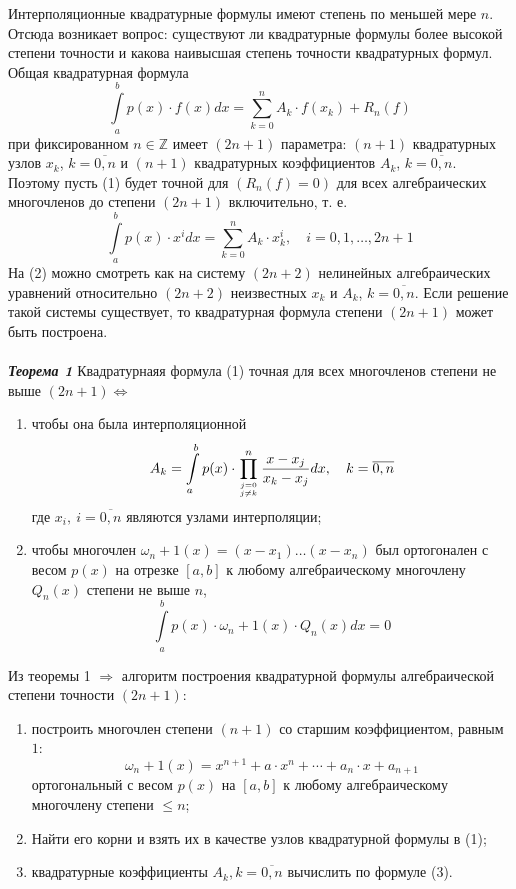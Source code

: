 \documentclass[14pt,a4paper,titlepage]{extarticle}
\begin{document}
Интерполяционные квадратурные формулы имеют степень по меньшей мере $n$. Отсюда возникает вопрос: существуют ли квадратурные формулы более высокой степени точности и какова наивысшая степень точности квадратурных формул. \\
Общая квадратурная формула
\begin{equation}
\int\limits_a^b p(x)\cdot f(x)dx = \sum_{k = 0}^n A_k \cdot f(x_k) + R_n(f)
\label{(1)}
\end{equation}
при фиксированном $n \in \mathbb{Z} $ имеет $(2n + 1)$ параметра: $(n+1)$ квадратурных узлов $x_k$, $k = \overline{0,n}$ и $(n+1)$ квадратурных коэффициентов $A_k$, $k = \overline{0,n}$. Поэтому пусть (1) будет точной для $( R_n ( f ) = 0 )$ для всех алгебраических многочленов до степени $(2n + 1)$ включительно, т. е.
\begin{equation}
\int\limits_a^b p(x)\cdot x^idx = \sum_{k = 0}^n A_k \cdot x_k^i,\quad i = 0, 1, \ldots, 2n+1
\label{(2)}
\end{equation}
На (2) можно смотреть как на систему $(2n+2)$ нелинейных алгебраических уравнений относительно $(2n+2)$ неизвестных $x_k$ и $A_k$, $k = \overline{0,n}$. Если решение такой системы существует, то квадратурная формула степени $(2n+1)$ может быть построена.
\\
\\
\textit{{\textbf{Теорема 1}}}
Квадратурнаяя формула (1) точная для всех многочленов степени не выше $(2n+1) \Leftrightarrow$ 
\begin{enumerate}
   \item чтобы она была интерполяционной
   \begin{equation}
		A_k = \int\limits_a^b p(x)\cdot \prod_{\genfrac{}{}{0pt}{}{j=0}{j\neq k}}^n \frac{x - x_j}{x_k - x_j} dx, \quad k = \overline{0,n}
		\label{(3)}
	\end{equation}
	где $x_i, \ i = \overline{0,n}$ являются узлами интерполяции;
	\item чтобы многочлен $\omega_n+1 (x) = (x-x_1)\ldots(x - x_n)$ был ортогонален с весом $p(x)$
	на отрезке $\left[  a, b\right] $ к любому алгебраическому многочлену $Q_n(x)$ степени не выше $n$, 
	\begin{equation}
		\int\limits_a^b p(x)\cdot \omega_n+1 (x) \cdot Q_n(x) dx = 0
		\label{(4)}
	\end{equation}
   \end{enumerate}
   Из теоремы 1 $\Rightarrow$ алгоритм	построения квадратурной формулы
алгебраической степени точности $(2n+1)$:
\begin{enumerate}
\item построить многочлен степени $(n +1)$ со старшим коэффициентом, равным $1$:
\begin{equation}
		\omega_n+1 (x) = x^{n+1} + a\cdot x^n + \cdots + a_n \cdot x + a_{n+1}
		\label{(5)}
	\end{equation}
	ортогональный с весом $p(x)$ на $\left[  a, b\right] $ к любому алгебраическому многочлену степени $\leqslant n$;
	\item Найти его корни и взять их в качестве узлов квадратурной формулы в (1);
	\item квадратурные коэффициенты $A_k , k = \overline{0,n}$ вычислить по формуле (3).
\end{enumerate}
\end{document}
